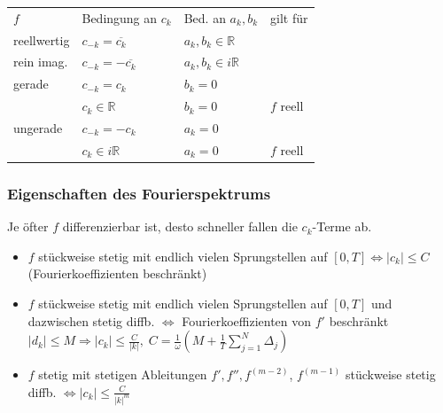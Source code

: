 \begin{sectionbox}
    \begin{tabular*}{\columnwidth}{@{\extracolsep\fill}llll@{}}
        $f$ & Bedingung an $c_k$ & Bed. an $a_k,b_k$ & gilt für \\
        reellwertig & $c_{-k}=\overline{c_k}$ & $a_k,b_k\in\mathbb R$ \\
        rein imag. & $c_{-k} = -\overline{c_k}$ & $a_k,b_k\in i\mathbb R$ \\
        gerade & $c_{-k} = c_k$ & $b_k=0$ \\
                & $c_k\in\mathbb R$ & $b_k=0$ & $f$ reell \\
        ungerade & $c_{-k}=-c_{k}$ & $a_k=0$ \\
                & $c_k\in i\mathbb R$ & $a_k=0$ & $f$ reell
    \end{tabular*}
\end{sectionbox}

\begin{sectionbox}
    \subsubsection{Eigenschaften des Fourierspektrums}
    Je öfter $f$ differenzierbar ist, desto schneller fallen die $c_k$-Terme ab.
    \begin{itemize}
        \item $f$ stückweise stetig mit endlich vielen Sprungstellen auf $[0,T] \Leftrightarrow |c_k| \le C$ (Fourierkoeffizienten beschränkt)
        \item $f$ stückweise stetig mit endlich vielen Sprungstellen auf $[0,T]$ und dazwischen stetig diffb. $\Leftrightarrow$ Fourierkoeffizienten von $f'$ beschränkt $|d_k| \le M \Rightarrow |c_k| \le \frac{C}{|k|}, \; C = \frac{1}{\omega}(M + \frac{1}{T}\sum_{j=1}^{N}\Delta_j)$
        \item $f$ stetig mit stetigen Ableitungen $f', f'', f^{(m-2)}$, $f^{(m-1)}$ stückweise stetig diffb. $\Leftrightarrow |c_k| \le \frac{C}{|k|^m}$
    \end{itemize}
\end{sectionbox}


